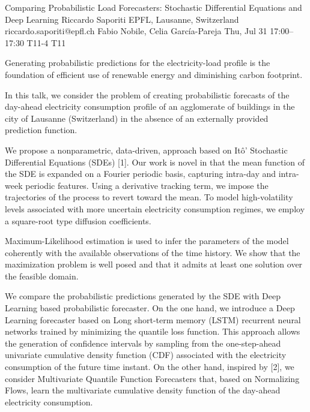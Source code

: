 \begin{talk}
  {Comparing Probabilistic Load Forecasters: Stochastic Differential Equations and Deep Learning}%
  {Riccardo Saporiti}%
  {EPFL, Lausanne, Switzerland}%
  {riccardo.saporiti@epfl.ch}%
  {Fabio Nobile, Celia García-Pareja}%
  {}%
  {Thu, Jul 31 17:00–17:30}%
  {T11-4}%
  {T11}%
  
				

Generating probabilistic predictions for the electricity-load profile is the foundation of efficient use of renewable energy and diminishing carbon footprint.

In this talk, we consider the problem of creating probabilistic forecasts of the day-ahead electricity consumption profile of an agglomerate of buildings in the city of Lausanne (Switzerland) in the absence of an externally provided prediction function. 
 
We propose a nonparametric, data-driven, approach based on Itô' Stochastic Differential Equations (SDEs) [1]. Our work is novel in that the mean function of the SDE is expanded on a Fourier periodic basis, capturing intra-day and intra-week periodic features. 
Using a derivative tracking term, we impose the trajectories of the process to revert toward the mean. To model high-volatility levels associated with more uncertain electricity consumption regimes, we employ a square-root type diffusion coefficients. 

Maximum-Likelihood estimation is used to infer the parameters of the model coherently with the available observations of the time history. We show that the maximization problem is well posed and that it admits at least one solution over the feasible domain. 

We compare the probabilistic predictions generated by the SDE with Deep Learning based probabilistic forecaster. 
On the one hand, we introduce a Deep Learning forecaster based on Long short-term memory (LSTM) recurrent neural networks trained by minimizing the quantile loss function. This approach allows the generation of confidence intervals by sampling from the one-step-ahead univariate cumulative density function (CDF) associated with the electricity consumption of the future time instant. 
On the other hand, inspired by [2], we consider Multivariate Quantile Function Forecasters that, based on Normalizing Flows, learn the multivariate cumulative density function of the day-ahead electricity consumption.


\end{talk}
